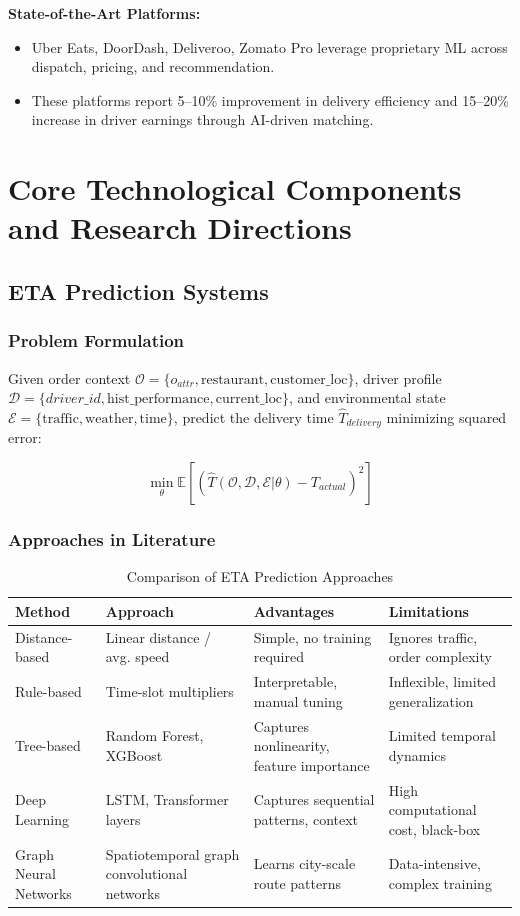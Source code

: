 \documentclass[12pt,a4paper]{report}
\begin{document}
\textbf{State-of-the-Art Platforms:}
\begin{itemize}
    \item Uber Eats, DoorDash, Deliveroo, Zomato Pro leverage proprietary ML across dispatch, pricing, and recommendation.
    \item These platforms report 5--10\% improvement in delivery efficiency and 15--20\% increase in driver earnings through AI-driven matching.
\end{itemize}

\section{Core Technological Components and Research Directions}

\subsection{ETA Prediction Systems}

\subsubsection{Problem Formulation}
Given order context $\mathcal{O} = \{o_{attr}, \text{restaurant}, \text{customer\_loc}\}$, driver profile $\mathcal{D} = \{driver\_id, \text{hist\_performance}, \text{current\_loc}\}$, and environmental state $\mathcal{E} = \{\text{traffic}, \text{weather}, \text{time}\}$, predict the delivery time $\hat{T}_{delivery}$ minimizing squared error:

$$\min_{\theta} \mathbb{E}\left[\left(\hat{T}(\mathcal{O}, \mathcal{D}, \mathcal{E} | \theta) - T_{actual}\right)^2\right]$$

\subsubsection{Approaches in Literature}

\begin{table}[H]
\centering
\caption{Comparison of ETA Prediction Approaches}
\begin{tabular}{p{2.5cm} p{3.5cm} p{3cm} p{3cm}}
\toprule
\textbf{Method} & \textbf{Approach} & \textbf{Advantages} & \textbf{Limitations} \\
\midrule
Distance-based & Linear distance / avg. speed & Simple, no training required & Ignores traffic, order complexity \\
Rule-based & Time-slot multipliers & Interpretable, manual tuning & Inflexible, limited generalization \\
Tree-based & Random Forest, XGBoost & Captures nonlinearity, feature importance & Limited temporal dynamics \\
Deep Learning & LSTM, Transformer layers & Captures sequential patterns, context & High computational cost, black-box \\
Graph Neural Networks & Spatiotemporal graph convolutional networks & Learns city-scale route patterns & Data-intensive, complex training \\
\bottomrule
\end{tabular}
\end{table}
\end{document}
